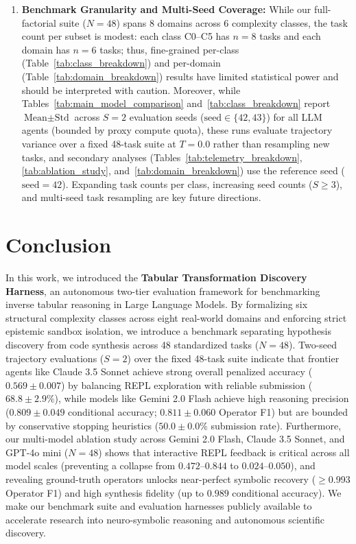 \documentclass[sigconf]{acmart}
\begin{document}
\begin{enumerate}
    \item \textbf{Benchmark Granularity and Multi-Seed Coverage:} While our full-factorial suite ($N=48$) spans 8 domains across 6 complexity classes, the task count per subset is modest: each class C0--C5 has $n=8$ tasks and each domain has $n=6$ tasks; thus, fine-grained per-class (Table~\ref{tab:class_breakdown}) and per-domain (Table~\ref{tab:domain_breakdown}) results have limited statistical power and should be interpreted with caution. Moreover, while Tables~\ref{tab:main_model_comparison} and~\ref{tab:class_breakdown} report $\text{Mean} \pm \text{Std}$ across $S=2$ evaluation seeds ($\text{seed} \in \{42,43\}$) for all LLM agents (bounded by proxy compute quota), these runs evaluate trajectory variance over a fixed 48-task suite at $T=0.0$ rather than resampling new tasks, and secondary analyses (Tables~\ref{tab:telemetry_breakdown}, \ref{tab:ablation_study}, and~\ref{tab:domain_breakdown}) use the reference seed ($\text{seed}=42$). Expanding task counts per class, increasing seed counts ($S \ge 3$), and multi-seed task resampling are key future directions.
\end{enumerate}

\section{Conclusion}
In this work, we introduced the \textbf{Tabular Transformation Discovery Harness}, an autonomous two-tier evaluation framework for benchmarking inverse tabular reasoning in Large Language Models. By formalizing six structural complexity classes across eight real-world domains and enforcing strict epistemic sandbox isolation, we introduce a benchmark separating hypothesis discovery from code synthesis across 48 standardized tasks ($N=48$). Two-seed trajectory evaluations ($S=2$) over the fixed 48-task suite indicate that frontier agents like Claude 3.5 Sonnet achieve strong overall penalized accuracy ($0.569 \pm 0.007$) by balancing REPL exploration with reliable submission ($68.8 \pm 2.9\%$), while models like Gemini 2.0 Flash achieve high reasoning precision ($0.809 \pm 0.049$ conditional accuracy; $0.811 \pm 0.060$ Operator F1) but are bounded by conservative stopping heuristics ($50.0 \pm 0.0\%$ submission rate). Furthermore, our multi-model ablation study across Gemini 2.0 Flash, Claude 3.5 Sonnet, and GPT-4o mini ($N=48$) shows that interactive REPL feedback is critical across all model scales (preventing a collapse from $0.472$--$0.844$ to $0.024$--$0.050$), and revealing ground-truth operators unlocks near-perfect symbolic recovery ($\ge$0.993 Operator F1) and high synthesis fidelity (up to $0.989$ conditional accuracy). We make our benchmark suite and evaluation harnesses publicly available to accelerate research into neuro-symbolic reasoning and autonomous scientific discovery.
\end{document}
